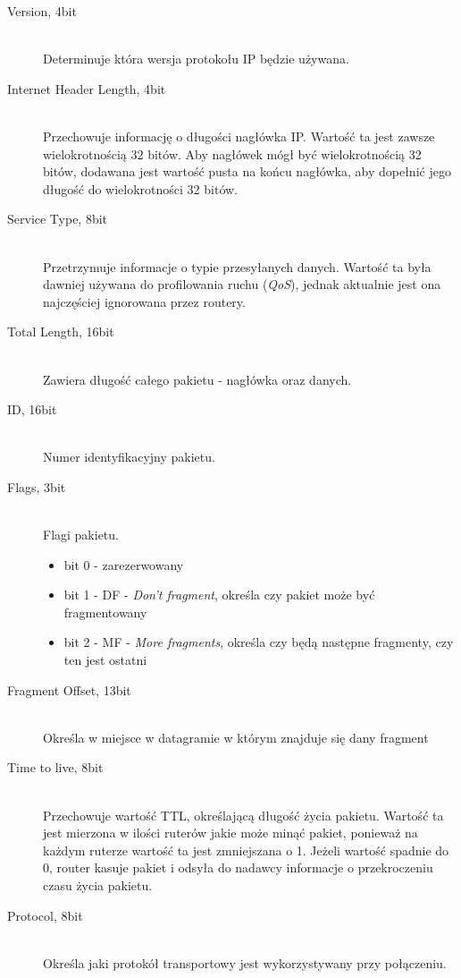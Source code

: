 			\begin{description}
			\item[Version, 4bit]\hfill\\
				Determinuje która wersja protokołu IP będzie używana.
			\item[Internet Header Length, 4bit]\hfill\\
				Przechowuje informację o długości nagłówka IP.
				Wartość ta jest zawsze wielokrotnością 32 bitów.
				Aby nagłówek mógł być wielokrotnością 32 bitów, dodawana jest wartość pusta na końcu nagłówka, aby dopełnić jego długość do wielokrotności 32 bitów.
			\item[Service Type, 8bit]\hfill \\
				Przetrzymuje informacje o typie przesyłanych danych.
				Wartość ta była dawniej używana do profilowania ruchu (\textit{QoS}), jednak aktualnie jest ona najczęściej ignorowana przez routery.
			\item[Total Length, 16bit]\hfill \\
				Zawiera długość całego pakietu - nagłówka oraz danych.
			\item[ID, 16bit]\hfill \\
				Numer identyfikacyjny pakietu.
			\item[Flags, 3bit]\hfill\\
				Flagi pakietu.
				\begin{itemize}
					\item bit 0 - zarezerwowany
					\item bit 1 - DF - \textit{Don't fragment}, określa czy pakiet może być fragmentowany
					\item bit 2 - MF - \textit{More fragments}, określa czy będą następne fragmenty, czy ten jest ostatni
				\end{itemize}
			\item[Fragment Offset, 13bit]\hfill\\
				Określa w miejsce w datagramie w którym znajduje się dany fragment
			\item[Time to live, 8bit]\hfill\\
				Przechowuje wartość TTL, określającą długość życia pakietu.
				Wartość ta jest mierzona w ilości ruterów jakie może minąć pakiet, ponieważ na każdym ruterze wartość ta jest zmniejszana o 1.
				Jeżeli wartość spadnie do 0, router kasuje pakiet i odsyła do nadawcy informacje o przekroczeniu czasu życia pakietu.
			\item[Protocol, 8bit]\hfill\\
				Określa jaki protokół transportowy jest wykorzystywany przy połączeniu.

\end{description}
